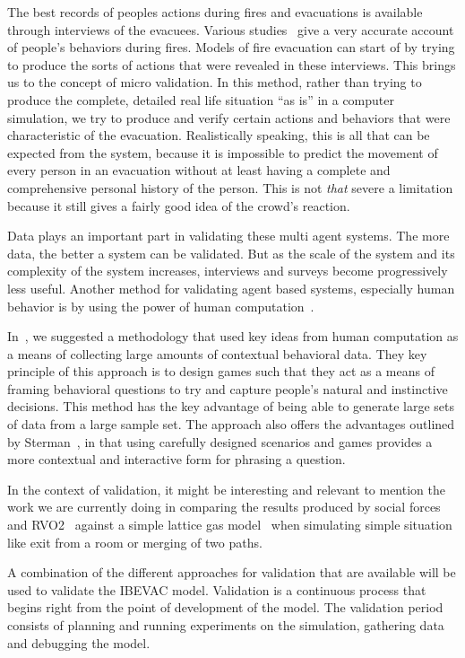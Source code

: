 The best records of peoples actions during fires and evacuations is available through interviews of the evacuees. Various studies~\cite{Torres:2010tj,Cocking:2007wp,Kobes:2009jx,Purser:2001ts} give a very accurate account of people's behaviors during fires. Models of fire evacuation can start of by trying to produce the sorts of actions that were revealed in these interviews. This brings us to the concept of micro validation. In this method, rather than trying to produce the complete, detailed real life situation ``as is'' in a computer simulation, we try to produce and verify certain actions and behaviors that were characteristic of the evacuation. Realistically speaking, this is all that can be expected from the system, because it is impossible to predict the movement of every person in an evacuation without at least having a complete and comprehensive personal history of the person. This is not \emph{that} severe a limitation because it still gives a fairly good idea of the crowd's reaction.

Data plays an important part in validating these multi agent systems. The more data, the better a system can be validated. But as the scale of the system and its complexity of the system increases, interviews and surveys become progressively less useful. Another method for validating agent based systems, especially human behavior is by using the power of human computation~\cite{VonAhn:2007wi}.

In~\cite{Pengfei:2011us}, we suggested a methodology that used key ideas from human computation as a means of collecting large amounts of contextual behavioral data. They key principle of this approach is to design games such that they act as a means of framing behavioral questions to try and capture people's natural and instinctive decisions. This method has the key advantage of being able to generate large sets of data from a large sample set. The approach also offers the advantages outlined by Sterman~\cite{Sterman:1987vk}, in that using carefully designed scenarios and games provides a more contextual and interactive form for phrasing a question.

In the context of validation, it might be interesting and relevant to mention the work we are currently doing in comparing the results produced by social forces~\cite{Helbing:2000ef} and RVO2~\cite{Guy:2010ko} against a simple lattice gas model~\cite{Nagai:2004kl} when simulating simple situation like exit from a room or merging of two paths.

A combination of the different approaches for validation that are available will be used to validate the IBEVAC model. Validation is a continuous process that begins right from the point of development of the model. The validation period consists of planning and running experiments on the simulation, gathering data and debugging the model.

